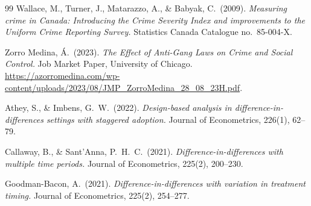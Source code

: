 \documentclass[11pt,a4paper]{article}
\theoremstyle{plain}
\theoremstyle{definition}
\theoremstyle{remark}
\begin{document}
\begin{thebibliography}{99}
Wallace, M., Turner, J., Matarazzo, A., \& Babyak, C.\ (2009).
\emph{Measuring crime in Canada: Introducing the Crime Severity
Index and improvements to the Uniform Crime Reporting Survey.}
Statistics Canada Catalogue no.\ 85-004-X.

Zorro Medina, {\'A}.\ (2023).
\emph{The Effect of Anti-Gang Laws on Crime and Social Control.}
Job Market Paper, University of Chicago.
\url{https://azorromedina.com/wp-content/uploads/2023/08/JMP_ZorroMedina_28_08_23H.pdf}.

Athey, S., \& Imbens, G.\ W.\ (2022).
\emph{Design-based analysis in difference-in-differences
settings with staggered adoption.}
Journal of Econometrics, 226(1), 62--79.

Callaway, B., \& Sant'Anna, P.\ H.\ C.\ (2021).
\emph{Difference-in-differences with multiple time periods.}
Journal of Econometrics, 225(2), 200--230.

Goodman-Bacon, A.\ (2021).
\emph{Difference-in-differences with variation in treatment
timing.}
Journal of Econometrics, 225(2), 254--277.

\end{thebibliography}
\end{document}
